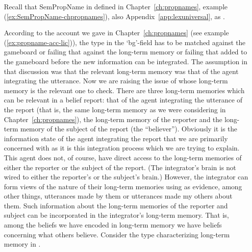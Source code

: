 Recall that SemPropName in defined in Chapter~\ref{ch:propnames},
example (\ref{ex:SemPropName-chpropnames}), also
Appendix~\ref{app:lexuniversal}, as \nexteg{}.
\begin{ex} 
\end{ex} 
According to the account we gave in Chapter~\ref{ch:propnames} (see
example (\ref{ex:propname-acc-lic})), the
type in the `bg'-field has to be matched against the gameboard or
failing that against the long-term memory or failing that added to the gameboard
before the new information can be integrated.  The assumption in that
discussion was that the relevant long-term memory was that of the
agent integrating the utterance. Now we are raising the issue of whose
long-term memory is the relevant one to check.  There are three
long-term memories which can be relevant in a belief report: that of
the agent integrating the utterance of the report (that is, the same
long-term memory as we were considering in
Chapter~\ref{ch:propnames}), the long-term memory of the reporter and
the long-term memory of the subject of the report (the ``believer'').
Obviously it is the information state of the agent integrating the
report that we are primarily concerned with as it is this integration
process which we are trying to explain.  This agent does not, of
course, have direct access to the long-term memories of either the
reporter or the subject of the report.  (The integrator's brain is not
wired to either the reporter's or the subject's brain.)  However, the
integrator can form views of the nature of their long-term memories
using as evidence, among other things, utterances made by them or utterances made
my others about them.  Such information about the
long-term memories of the reporter and subject can be incorporated in
the integrator's long-term memory.  That is, among the beliefs we have
encoded in long-term memory we have beliefs concerning what others
believe.  Consider the type characterizing long-term memory in
\nexteg{}.
